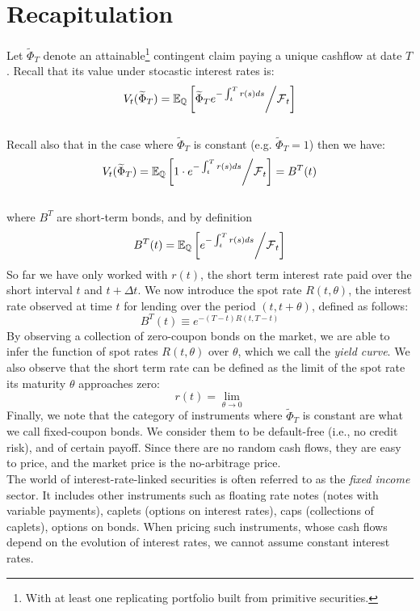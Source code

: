\documentclass[11pt]{article}
\date{Lecture 4 (29 Jan. 2013)}
\begin{document}
{\small \maketitle}

\section{Recapitulation}

Let $\widetilde{\Phi}_T$ denote an attainable\footnote{With at least one replicating portfolio built from primitive securities.} contingent claim paying a unique cashflow at date $T$. Recall that its value under stocastic interest rates is:
$$ V_t(\widetilde{\Phi}_T) = \operatorname{\mathbb E}_{\operatorname{\mathbb Q}} \left[ \widetilde{\Phi}_T e^{-\int_t^T r(s) ds} \middle/ \operatorname{\mathcal F}_t \right]$$\\
Recall also that in the case where $\widetilde{\Phi}_T$ is constant (e.g. $\widetilde{\Phi}_T = 1$) then we have:
$$ V_t(\widetilde{\Phi}_T) = \operatorname{\mathbb E}_{\operatorname{\mathbb Q}} \left[ 1 \cdot e^{-\int_t^T r(s) ds} \middle/ \operatorname{\mathcal F}_t \right] = B^T(t)$$\\
where $B^T$ are short-term bonds, and by definition
$$B^T(t) = \operatorname{\mathbb E}_{\operatorname{\mathbb Q}} \left[ e^{-\int_t^T r(s) ds} \middle/ \operatorname{\mathcal F}_t \right]$$
So far we have only worked with $r(t)$, the short term interest rate paid over the short interval $t$ and $t+\Delta t$. We now introduce the spot rate $R(t, \theta)$, the interest rate observed at time $t$ for lending over the period $(t, t+\theta)$, defined as follows:
$$B^T(t) \equiv e^{-(T-t)R(t,T-t)}$$
By observing a collection of zero-coupon bonds on the market, we are able to infer the function of spot rates $R(t, \theta)$ over $\theta$, which we call the {\em yield curve}.
We also observe that the short term rate can be defined as the limit of the spot rate its maturity $\theta$ approaches zero:
$$r(t) = \lim_{\theta \rightarrow 0} $$
Finally, we note that the category of instruments where $\widetilde{\Phi}_T$ is constant are what we call fixed-coupon bonds. We consider them to be default-free (i.e., no credit risk), and of certain payoff. Since there are no random cash flows, they are easy to price, and the market price is the no-arbitrage price. \\

The world of interest-rate-linked securities is often referred to as the {\em fixed income} sector. It includes other instruments such as floating rate notes (notes with variable payments), caplets (options on interest rates), caps (collections of caplets), options on bonds. When pricing such instruments, whose cash flows depend on the evolution of interest rates, we cannot assume constant interest rates. \\
\end{document}
